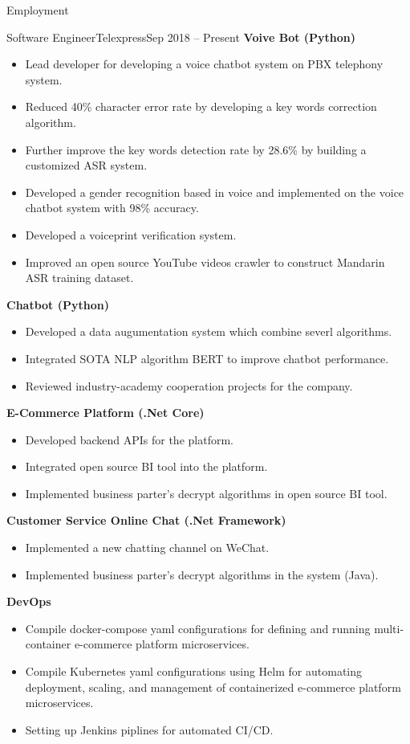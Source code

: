 \documentclass[]{mcdowellcv}
\begin{document}
	\makeheader
	
	\begin{cvsection}{Employment}
		\begin{cvsubsection}{Software Engineer}{Telexpress}{Sep 2018 -- Present}
			\textbf{Voive Bot (Python)}
			\begin{itemize}
				\item Lead developer for developing a voice chatbot system on PBX telephony system.
				\item Reduced 40\% character error rate by developing a key words correction algorithm.
				\item Further improve the key words detection rate by 28.6\% by building a customized ASR system.
				\item Developed a gender recognition based in voice and implemented on the voice chatbot system with 98\% accuracy.
				\item Developed a voiceprint verification system.
				\item Improved an open source YouTube videos crawler to construct Mandarin ASR training dataset.
			\end{itemize}
			\textbf{Chatbot (Python)}
			\begin{itemize}
				\item Developed a data augumentation system which combine severl algorithms.
				\item Integrated SOTA NLP algorithm BERT to improve chatbot performance.
				\item Reviewed industry-academy cooperation projects for the company.
			\end{itemize}
			\textbf{E-Commerce Platform (.Net Core)}
			\begin{itemize}
				\item Developed backend APIs for the platform.
				\item Integrated open source BI tool into the platform.
				\item Implemented business parter's decrypt algorithms in open source BI tool.
			\end{itemize}
			\textbf{Customer Service Online Chat (.Net Framework)}
			\begin{itemize}
				\item Implemented a new chatting channel on WeChat.
				\item Implemented business parter's decrypt algorithms in the system (Java).
			\end{itemize}
			\textbf{DevOps}
			\begin{itemize}
				\item Compile docker-compose yaml configurations for defining and running multi-container e-commerce platform microservices.
				\item Compile Kubernetes yaml configurations using Helm for automating deployment, scaling, and management of containerized e-commerce platform microservices.
				\item Setting up Jenkins piplines for automated CI/CD.
			\end{itemize}
		\end{cvsubsection}
	\end{cvsection}
	
\end{document}
